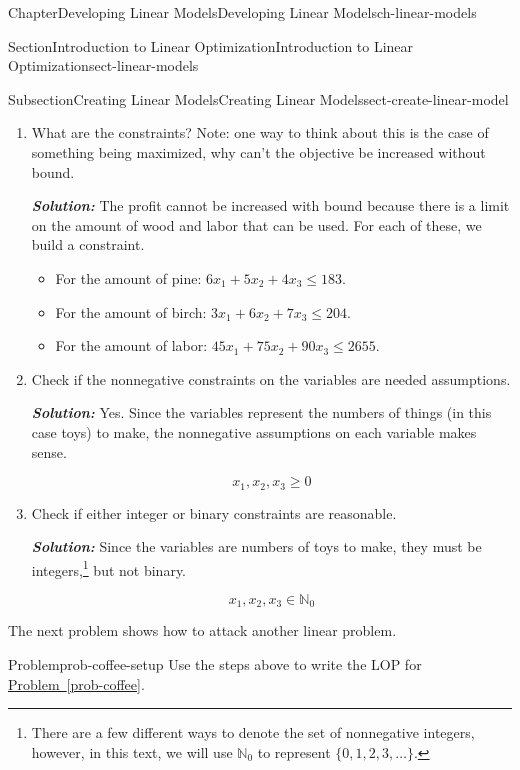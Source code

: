 \documentclass[oneside,10pt,]{book}
\newcommand{\xreffont}{\relax}
\newcommand{\alert}[1]{\textbf{\textit{#1}}}
\numberwithin{equation}{section}
\begin{document}
\begin{chapterptx}{Chapter}{Developing Linear Models}{}{Developing Linear Models}{}{}{ch-linear-models}
\begin{sectionptx}{Section}{Introduction to Linear Optimization}{}{Introduction to Linear Optimization}{}{}{sect-linear-models}
\begin{subsectionptx}{Subsection}{Creating Linear Models}{}{Creating Linear Models}{}{}{sect-create-linear-model}
\begin{enumerate}
%
\begin{equation*}
z = 10 x_1 + 15 x_2 + 12 x_3.
\end{equation*}
%
\item{}What are the constraints?  Note: one way to think about this is the case of something being maximized, why can't the objective be increased without bound.%
\par
\alert{Solution:} The profit cannot be increased with bound because there is a limit on the amount of wood and labor that can be used.  For each of these, we build a constraint.%
\par
%
\begin{itemize}[label=\textbullet]
\item{}For the amount of pine: \(6x_1 + 5x_2 + 4x_3 \leq 183.\)%
\item{}For the amount of birch: \(3x_1 + 6x_2 + 7x_3 \leq 204.\)%
\item{}For the amount of labor: \(45x_1 + 75x_2 + 90x_3 \leq 2655.\)%
\end{itemize}
%
\item{}Check if the nonnegative constraints on the variables are needed assumptions.%
\par
\alert{Solution:} Yes.  Since the variables represent the numbers of things (in this case toys) to make, the nonnegative assumptions on each variable makes sense.%
\par
%
\begin{equation*}
x_1, x_2, x_3 \geq 0
\end{equation*}
%
\item{}Check if either integer or binary constraints are reasonable.%
\par
\alert{Solution:} Since the variables are numbers of toys to make, they must be integers,\footnote{There are a few different ways to denote the set of nonnegative integers, however, in this text, we will use \(\mathbb{N}_0\) to represent \(\{0,1,2,3, \ldots \}\).\label{sect-create-linear-model-3-1-5-2-2}} but not binary.%
\par
%
\begin{equation*}
x_1, x_2, x_3 \in \mathbb{N}_0
\end{equation*}
%
\end{enumerate}
%
\par
The next problem shows how to attack another linear problem.%
\begin{problem}{Problem}{}{prob-coffee-setup}%
Use the steps above to write the LOP for \hyperref[prob-coffee]{Problem~{\xreffont\ref{prob-coffee}}}.%

\end{problem}
\end{subsectionptx}
\end{sectionptx}
\end{chapterptx}
\end{document}
